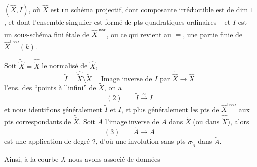 $(\widehat X,I)$, où $\widehat X$ est un schéma projectif, dont  composante irréductible est de dim $1$, et dont l'ensemble singulier est formé de pts quadratiques ordinaires -- et $I$ est un sous-schéma fini étale de $\widehat X^{\mathrm{lisse}}$, ou ce qui revient au $=$, une partie finie de $\widehat X^{\mathrm{lisse}}(k)$.

Soit $\widetilde{\widehat X}=\widehat{\widetilde X}$ le normalisé de $\widehat X$, 
\[
\widetilde I=\widehat{\widetilde X}\setminus\widetilde X
=\text{Image inverse de }I\text{ par }\widetilde{\widehat X}\to\widehat X
\]
l'ens. des  ``points à l'infini'' de $\widetilde X$, on a
\[
(2)\qquad\widetilde I\xrightarrow{\sim}I
\]
et nous identifions généralement $\widetilde I$ et $I$, et plus généralement  les pts de $\widehat X^{\mathrm{lisse}}$ aux pts correspondants de $\widetilde{\widehat X}$. Soit $\widetilde A$ l'image inverse de $A$ dans $\widetilde X$ (ou dans $\widehat{\widetilde X}$), alors
\[
(3)\qquad\widetilde A\longrightarrow A
\]
est une application de degré $2$, d'où une involution sans pts  $\sigma_{\widetilde A}$ dans $\widetilde A$.

Ainsi, à la courbe  $X$ nous avons associé  de données
